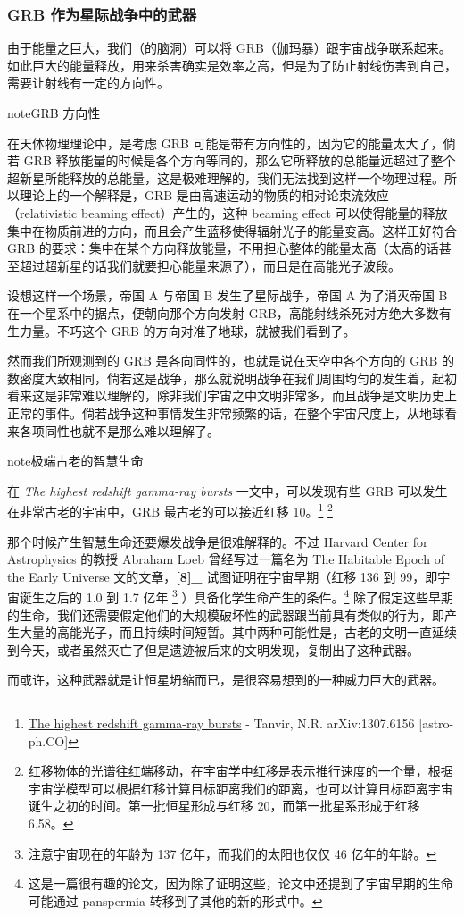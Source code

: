 \documentclass[letterpaper,10pt,english]{sphinxmanual}
\begin{document}
\subsubsection{GRB 作为星际战争中的武器}
\label{physics:grb}
由于能量之巨大，我们（的脑洞）可以将 GRB（伽玛暴）跟宇宙战争联系起来。如此巨大的能量释放，用来杀害确实是效率之高，但是为了防止射线伤害到自己，需要让射线有一定的方向性。

\begin{notice}{note}{GRB 方向性}

在天体物理理论中，是考虑 GRB 可能是带有方向性的，因为它的能量太大了，倘若 GRB 释放能量的时候是各个方向等同的，那么它所释放的总能量远超过了整个超新星所能释放的总能量，这是极难理解的，我们无法找到这样一个物理过程。所以理论上的一个解释是，GRB 是由高速运动的物质的相对论束流效应（relativistic beaming effect）产生的，这种 beaming effect 可以使得能量的释放集中在物质前进的方向，而且会产生蓝移使得辐射光子的能量变高。这样正好符合 GRB 的要求：集中在某个方向释放能量，不用担心整体的能量太高（太高的话甚至超过超新星的话我们就要担心能量来源了），而且是在高能光子波段。
\end{notice}

设想这样一个场景，帝国 A 与帝国 B 发生了星际战争，帝国 A 为了消灭帝国 B 在一个星系中的据点，便朝向那个方向发射 GRB，高能射线杀死对方绝大多数有生力量。不巧这个 GRB 的方向对准了地球，就被我们看到了。

然而我们所观测到的 GRB 是各向同性的，也就是说在天空中各个方向的 GRB 的数密度大致相同，倘若这是战争，那么就说明战争在我们周围均匀的发生着，起初看来这是非常难以理解的，除非我们宇宙之中文明非常多，而且战争是文明历史上正常的事件。倘若战争这种事情发生非常频繁的话，在整个宇宙尺度上，从地球看来各项同性也就不是那么难以理解了。

\begin{notice}{note}{极端古老的智慧生命}

在 \emph{The highest redshift gamma-ray bursts} 一文中，可以发现有些 GRB 可以发生在非常古老的宇宙中，GRB 最古老的可以接近红移 10。\footnote{
\href{http://arxiv.org/abs/1307.6156}{The highest redshift gamma-ray bursts} - Tanvir, N.R. arXiv:1307.6156 {[}astro-ph.CO{]}
} \footnote{
红移物体的光谱往红端移动，在宇宙学中红移是表示推行速度的一个量，根据宇宙学模型可以根据红移计算目标距离我们的距离，也可以计算目标距离宇宙诞生之初的时间。第一批恒星形成与红移 20，而第一批星系形成于红移 6.58。
}

那个时候产生智慧生命还要爆发战争是很难解释的。不过 Harvard Center for Astrophysics 的教授 Abraham Loeb 曾经写过一篇名为 The Habitable Epoch of the Early Universe 文的文章，{\color{red}\bfseries{}{[}8{]}\_} 试图证明在宇宙早期（红移 136 到 99，即宇宙诞生之后的 1.0 到 1.7 亿年 \footnote{
注意宇宙现在的年龄为 137 亿年，而我们的太阳也仅仅 46 亿年的年龄。
} ）具备化学生命产生的条件。\footnote{
这是一篇很有趣的论文，因为除了证明这些，论文中还提到了宇宙早期的生命可能通过 panspermia 转移到了其他的新的形式中。
} 除了假定这些早期的生命，我们还需要假定他们的大规模破坏性的武器跟当前具有类似的行为，即产生大量的高能光子，而且持续时间短暂。其中两种可能性是，古老的文明一直延续到今天，或者虽然灭亡了但是遗迹被后来的文明发现，复制出了这种武器。

而或许，这种武器就是让恒星坍缩而已，是很容易想到的一种威力巨大的武器。
\end{notice}
\end{document}

